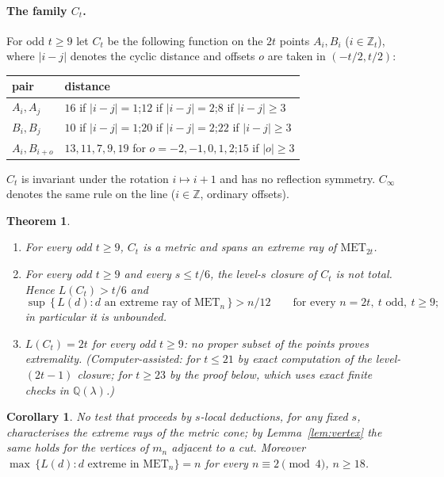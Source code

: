 \documentclass[11pt,a4paper]{article}
\newtheorem{theorem}{Theorem}
\newtheorem*{corollary}{Corollary}
\theoremstyle{definition}
\theoremstyle{remark}
\newcommand{\MET}{\mathrm{MET}}
\newcommand{\Z}{\mathbb{Z}}
\newcommand{\Q}{\mathbb{Q}}
\begin{document}
\paragraph{The family $C_t$.} For odd $t \ge 9$ let $C_t$ be the following function on the $2t$ points $A_i, B_i$
($i \in \Z_t$), where $|i - j|$ denotes the cyclic distance and offsets $o$ are taken in $(-t/2, t/2)$:
\begin{center}
\begin{tabular}{ll}
\toprule
pair & distance \\
\midrule
$A_i, A_j$ & $16$ if $|i - j| = 1$;\quad $12$ if $|i - j| = 2$;\quad $8$ if $|i - j| \ge 3$ \\
$B_i, B_j$ & $10$ if $|i - j| = 1$;\quad $20$ if $|i - j| = 2$;\quad $22$ if $|i - j| \ge 3$ \\
$A_i, B_{i+o}$ & $13, 11, 7, 9, 19$ for $o = -2, -1, 0, 1, 2$;\quad $15$ if $|o| \ge 3$ \\
\bottomrule
\end{tabular}
\end{center}
$C_t$ is invariant under the rotation $i \mapsto i + 1$ and has no reflection symmetry. $C_\infty$ denotes the same
rule on the line ($i \in \Z$, ordinary offsets).

\begin{theorem}\label{thm:main}
\begin{enumerate}[label=\textup{(\alph*)},leftmargin=*]
\item For every odd $t \ge 9$, $C_t$ is a metric and spans an extreme ray of $\MET_{2t}$.
\item For every odd $t \ge 9$ and every $s \le t/6$, the level-$s$ closure of $C_t$ is not total. Hence
  $L(C_t) > t/6$ and
  \[
    \sup\,\{\, L(d) : d \text{ an extreme ray of } \MET_n \,\} > n/12 \qquad\text{for every } n = 2t,\ t \text{ odd},\ t \ge 9;
  \]
  in particular it is unbounded.
\item $L(C_t) = 2t$ for every odd $t \ge 9$: no proper subset of the points proves extremality. (Computer-assisted:
  for $t \le 21$ by exact computation of the level-$(2t - 1)$ closure; for $t \ge 23$ by the proof below, which uses
  exact finite checks in $\Q(\lambda)$.)
\end{enumerate}
\end{theorem}

\begin{corollary}
No test that proceeds by $s$-local deductions, for any fixed $s$, characterises the extreme rays of the metric cone;
by Lemma~\ref{lem:vertex} the same holds for the vertices of $m_n$ adjacent to a cut. Moreover
$\max\,\{ L(d) : d \text{ extreme in } \MET_n \} = n$ for every $n \equiv 2 \pmod 4$, $n \ge 18$.
\end{corollary}
\end{document}
